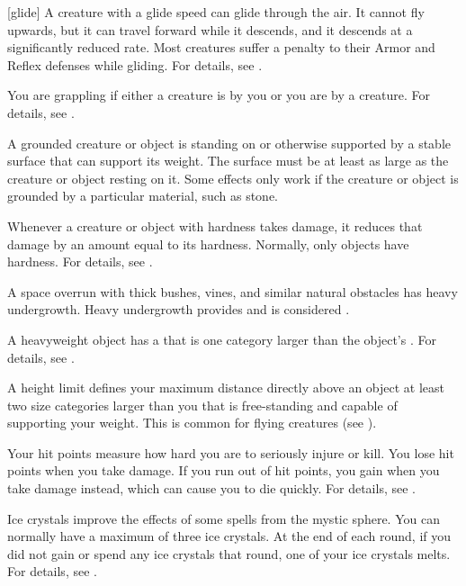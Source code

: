 [glide] A creature with a glide speed can glide through the air.
It cannot fly upwards, but it can travel forward while it descends, and it descends at a significantly reduced rate.
Most creatures suffer a  penalty to their Armor and Reflex defenses while gliding.
For details, see .

 You are grappling if either a creature is \grappled by you or you are \grappled by a creature.
For details, see .

 A grounded creature or object is standing on or otherwise supported by a stable surface that can support its weight.
The surface must be at least as large as the creature or object resting on it.
Some effects only work if the creature or object is grounded by a particular material, such as stone.

 Whenever a creature or object with hardness takes damage, it reduces that damage by an amount equal to its hardness.
Normally, only objects have hardness.
For details, see .

 A space overrun with thick bushes, vines, and similar natural obstacles has heavy undergrowth.
Heavy undergrowth provides  and is considered .

 A heavyweight object has a  that is one category larger than the object's .
For details, see .

 A height limit defines your maximum distance directly above an object at least two size categories larger than you that is free-standing and capable of supporting your weight.
This is common for flying creatures (see ).

 Your hit points measure how hard you are to seriously injure or kill.
You lose hit points when you take damage.
If you run out of hit points, you gain  when you take damage instead, which can cause you to die quickly.
For details, see .

 Ice crystals improve the effects of some spells from the  mystic sphere.
You can normally have a maximum of three ice crystals.
At the end of each round, if you did not gain or spend any ice crystals that round, one of your ice crystals melts.
For details, see .

